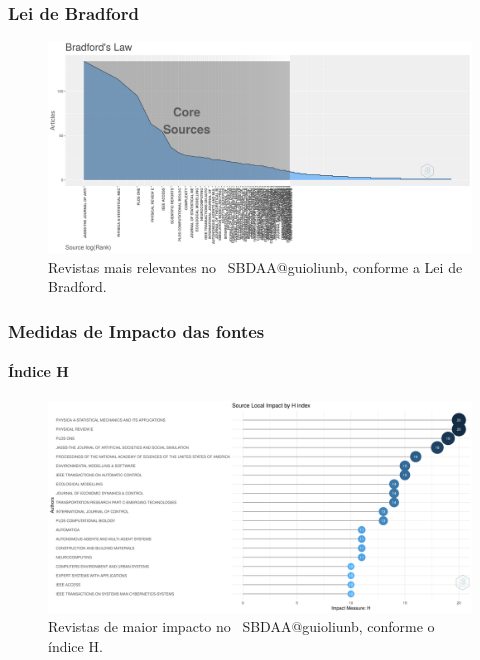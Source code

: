 \subsubsection{Lei de Bradford}

\begin{figure}
    \centering
    \includegraphics[width=1\textwidth]{experiments/jhcf/PesqBibliogr/SimulacaoMultiagente/WoS-20220203/Metricas/Sources/MASSA2-Bradfords-Law.png}
    \caption{Revistas mais relevantes no  \dataset\ SBDAA@guioliunb, conforme a Lei de Bradford.}
    \label{fig:MASSA2-Bradfords-Law.png}
\end{figure}

\subsubsection{Medidas de Impacto das fontes}

\paragraph{Índice H}

\begin{figure}
    \centering
    \includegraphics[width=1\textwidth]{experiments/jhcf/PesqBibliogr/SimulacaoMultiagente/WoS-20220203/Metricas/Sources/MASSA2-H-Index-Source-Local-Impact.png}
    \caption{Revistas de maior impacto no  \dataset\ SBDAA@guioliunb,  conforme o índice H.}
    \label{fig:MASSA2-H-Index-Source-Local-Impact.png}
\end{figure}


